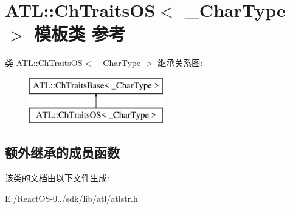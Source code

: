 \hypertarget{class_a_t_l_1_1_ch_traits_o_s}{}\section{A\+TL\+:\+:Ch\+Traits\+OS$<$ \+\_\+\+Char\+Type $>$ 模板类 参考}
\label{class_a_t_l_1_1_ch_traits_o_s}
类 A\+TL\+:\+:Ch\+Traits\+OS$<$ \+\_\+\+Char\+Type $>$ 继承关系图\+:\begin{figure}[H]
\begin{center}
\leavevmode
\includegraphics[height=2.000000cm]{class_a_t_l_1_1_ch_traits_o_s}
\end{center}
\end{figure}
\subsection*{额外继承的成员函数}


该类的文档由以下文件生成\+:\begin{DoxyCompactItemize}
\item 
E\+:/\+React\+O\+S-\/0../sdk/lib/atl/atlstr.\+h\end{DoxyCompactItemize}
